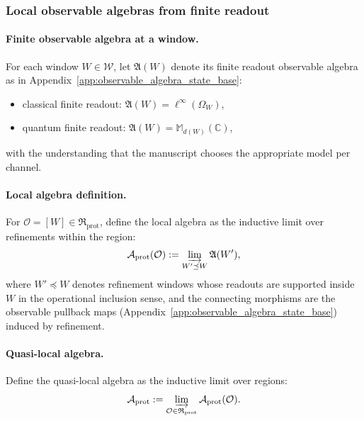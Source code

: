 \subsubsection{Local observable algebras from finite readout}
\paragraph{Finite observable algebra at a window.}
For each window $W\in\mathcal{W}$, let $\mathfrak{A}(W)$ denote its finite readout observable algebra as in Appendix~\ref{app:observable_algebra_state_base}:
\begin{itemize}
\item classical finite readout: $\mathfrak{A}(W)=\ell^\infty(\Omega_W)$,
\item quantum finite readout: $\mathfrak{A}(W)=\mathbb{M}_{d(W)}(\mathbb{C})$,
\end{itemize}
with the understanding that the manuscript chooses the appropriate model per channel.

\paragraph{Local algebra definition.}
For $\mathcal{O}=[W]\in\mathfrak{R}_{\mathrm{prot}}$, define the local algebra as the inductive limit over refinements within the region:
\[
\mathcal{A}_{\mathrm{prot}}(\mathcal{O})
:=\varinjlim_{W'\preceq W} \mathfrak{A}(W'),
\]
where $W'\preceq W$ denotes refinement windows whose readouts are supported inside $W$ in the operational inclusion sense, and the connecting morphisms are the observable pullback maps (Appendix~\ref{app:observable_algebra_state_base}) induced by refinement.

\paragraph{Quasi-local algebra.}
Define the quasi-local algebra as the inductive limit over regions:
\[
\mathcal{A}_{\mathrm{prot}}
:=\varinjlim_{\mathcal{O}\in\mathfrak{R}_{\mathrm{prot}}}\mathcal{A}_{\mathrm{prot}}(\mathcal{O}).
\]

